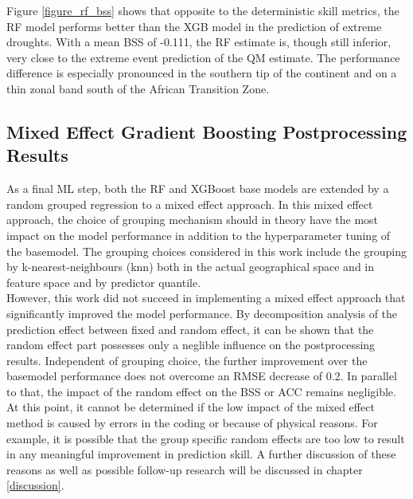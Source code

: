 \documentclass[ba-lentz.tex]{subfile}
\begin{document}
Figure \ref{figure_rf_bss} shows that opposite to the deterministic skill metrics, the RF model performs better than the XGB model in the prediction of extreme droughts.
With a mean BSS of -0.111, the RF estimate is, though still inferior, very close to the extreme event prediction of the QM estimate.
The performance difference is especially pronounced in the southern tip of the continent and on a thin zonal band south of the African Transition Zone.


\subsection{Mixed Effect Gradient Boosting Postprocessing Results}

As a final ML step, both the RF and XGBoost base models are extended by a random grouped regression to a mixed effect approach.
In this mixed effect approach, the choice of grouping mechanism should in theory have the most impact on the model performance in addition to the hyperparameter tuning of the basemodel.
The grouping choices considered in this work include the grouping by k-nearest-neighbours (knn) both in the actual geographical space and in feature space and by predictor quantile. \\
However, this work did not succeed in implementing a mixed effect approach that significantly improved the model performance.
By decomposition analysis of the prediction effect between fixed and random effect, it can be shown that the random effect part possesses only a neglible influence on the postprocessing results.
Independent of grouping choice, the further improvement over the basemodel performance does not overcome an RMSE decrease of 0.2.
In parallel to that, the impact of the random effect on the BSS or ACC remains negligible.
\\
At this point, it cannot be determined if the low impact of the mixed effect method is caused by errors in the coding or because of physical reasons.
For example, it is possible that the group specific random effects are too low to result in any meaningful improvement in prediction skill.
A further discussion of these reasons as well as possible follow-up research will be discussed in chapter \ref{discussion}.
\end{document}
